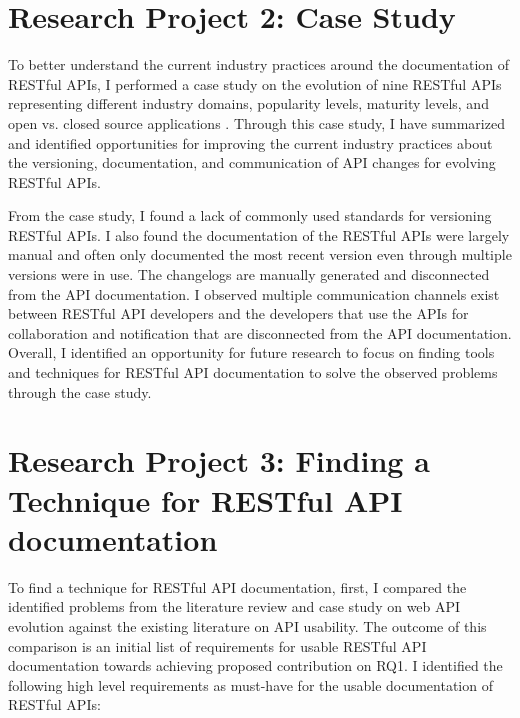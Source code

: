 \documentclass[11pt,oneside]{book}
\begin{document}
\section{Research Project 2: Case Study}

To better understand the current industry practices around the documentation of RESTful APIs, I performed a case study on the evolution of nine RESTful APIs representing different industry domains, popularity levels, maturity levels, and open vs. closed source applications \cite{sohan2015case}. Through this case study, I have summarized and identified opportunities for improving the current industry practices about the versioning, documentation, and communication of API changes for evolving RESTful APIs.

From the case study, I found a lack of commonly used standards for versioning RESTful APIs. I also found the documentation of the RESTful APIs were largely manual and often only documented the most recent version even through multiple versions were in use. The changelogs are manually generated and disconnected from the API documentation. I observed multiple communication channels exist between RESTful API developers and the developers that use the APIs for collaboration and notification that are disconnected from the API documentation. Overall, I identified an opportunity for future research to focus on finding tools and techniques for RESTful API documentation to solve the observed problems through the case study.

\section{Research Project 3: Finding a Technique for RESTful API documentation}

To find a technique for RESTful API documentation, first, I compared the identified problems from the literature review and case study on web API evolution against the existing literature on API usability. The outcome of this comparison is an initial list of requirements for usable RESTful API documentation towards achieving proposed contribution on RQ1. I identified the following high level requirements as must-have for the usable documentation of RESTful APIs:
\end{document}
